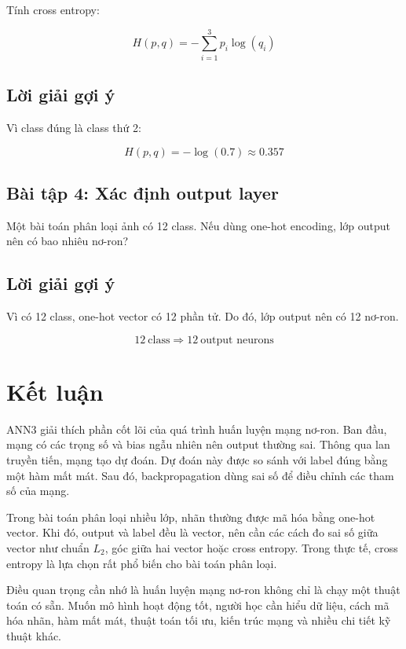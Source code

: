 \documentclass[12pt,a4paper]{report}
\begin{document}
Tính cross entropy:

\[
    H(p,q)=-\sum_{i=1}^{3}p_i\log(q_i)
\]

\section*{Lời giải gợi ý}

Vì class đúng là class thứ 2:

\[
    H(p,q)=-\log(0.7)\approx 0.357
\]

\section*{Bài tập 4: Xác định output layer}

Một bài toán phân loại ảnh có 12 class. Nếu dùng one-hot encoding, lớp output nên có bao nhiêu nơ-ron?

\section*{Lời giải gợi ý}

Vì có 12 class, one-hot vector có 12 phần tử. Do đó, lớp output nên có 12 nơ-ron.

\[
    12\ \text{class} \Rightarrow 12\ \text{output neurons}
\]

\chapter*{Kết luận}

ANN3 giải thích phần cốt lõi của quá trình huấn luyện mạng nơ-ron. Ban đầu, mạng có các trọng số và bias ngẫu nhiên nên output thường sai. Thông qua lan truyền tiến, mạng tạo dự đoán. Dự đoán này được so sánh với label đúng bằng một hàm mất mát. Sau đó, backpropagation dùng sai số để điều chỉnh các tham số của mạng.

Trong bài toán phân loại nhiều lớp, nhãn thường được mã hóa bằng one-hot vector. Khi đó, output và label đều là vector, nên cần các cách đo sai số giữa vector như chuẩn $L_2$, góc giữa hai vector hoặc cross entropy. Trong thực tế, cross entropy là lựa chọn rất phổ biến cho bài toán phân loại.

Điều quan trọng cần nhớ là huấn luyện mạng nơ-ron không chỉ là chạy một thuật toán có sẵn. Muốn mô hình hoạt động tốt, người học cần hiểu dữ liệu, cách mã hóa nhãn, hàm mất mát, thuật toán tối ưu, kiến trúc mạng và nhiều chi tiết kỹ thuật khác.
\end{document}
